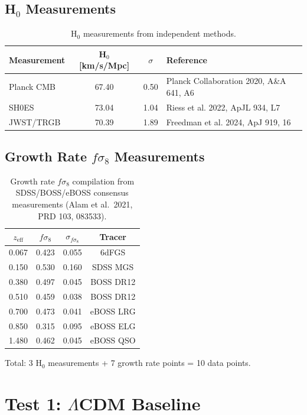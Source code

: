 \documentclass[11pt,letterpaper]{article}
\begin{document}
\subsection{H$_0$ Measurements}

\begin{table}[h]
\centering
\begin{tabular}{lccl}
\toprule
Measurement & H$_0$ [km/s/Mpc] & $\sigma$ & Reference \\
\midrule
Planck CMB & 67.40 & 0.50 & Planck Collaboration 2020, A\&A 641, A6 \\
SH0ES & 73.04 & 1.04 & Riess et al. 2022, ApJL 934, L7 \\
JWST/TRGB & 70.39 & 1.89 & Freedman et al. 2024, ApJ 919, 16 \\
\bottomrule
\end{tabular}
\caption{H$_0$ measurements from independent methods.}
\end{table}

\subsection{Growth Rate $f\sigma_8$ Measurements}

\begin{table}[h]
\centering
\begin{tabular}{cccc}
\toprule
$z_{\text{eff}}$ & $f\sigma_8$ & $\sigma_{f\sigma_8}$ & Tracer \\
\midrule
0.067 & 0.423 & 0.055 & 6dFGS \\
0.150 & 0.530 & 0.160 & SDSS MGS \\
0.380 & 0.497 & 0.045 & BOSS DR12 \\
0.510 & 0.459 & 0.038 & BOSS DR12 \\
0.700 & 0.473 & 0.041 & eBOSS LRG \\
0.850 & 0.315 & 0.095 & eBOSS ELG \\
1.480 & 0.462 & 0.045 & eBOSS QSO \\
\bottomrule
\end{tabular}
\caption{Growth rate $f\sigma_8$ compilation from SDSS/BOSS/eBOSS consensus measurements (Alam et al.\ 2021, PRD 103, 083533).}
\end{table}

\noindent Total: 3 H$_0$ measurements + 7 growth rate points = 10 data points.

\section{Test 1: $\Lambda$CDM Baseline}
\end{document}
